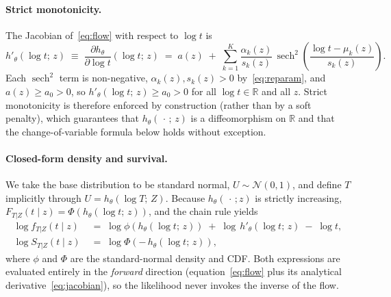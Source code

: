 \paragraph{Strict monotonicity.}
The Jacobian of~\eqref{eq:flow} with respect to $\log t$ is
\begin{equation}
    h'_\theta(\log t;\, z)
    \;\equiv\;
    \frac{\partial h_\theta}{\partial \log t}(\log t;\, z)
    \;=\;
    a(z) \;+\; \sum_{k=1}^{K} \frac{\alpha_k(z)}{s_k(z)}\,
        \operatorname{sech}^{2}\!\left(\frac{\log t - \mu_k(z)}{s_k(z)}\right).
    \label{eq:jacobian}
\end{equation}
Each $\operatorname{sech}^{2}$ term is non-negative, $\alpha_k(z), s_k(z) > 0$
by~\eqref{eq:reparam}, and $a(z) \ge a_0 > 0$, so
$h'_\theta(\log t;\, z) \ge a_0 > 0$ for all $\log t \in \mathbb{R}$ and all
$z$. Strict monotonicity is therefore enforced by construction (rather than
by a soft penalty), which guarantees that $h_\theta(\,\cdot\,;\, z)$ is a
diffeomorphism on $\mathbb{R}$ and that the change-of-variable formula below
holds without exception.

\paragraph{Closed-form density and survival.}
We take the base distribution to be standard normal, $U \sim \mathcal{N}(0, 1)$,
and define $T$ implicitly through $U = h_\theta(\log T;\, Z)$. Because
$h_\theta(\,\cdot\,; z)$ is strictly increasing,
$F_{T|Z}(t \mid z) = \Phi(h_\theta(\log t;\, z))$, and the chain rule
yields
\begin{align}
    \log f_{T|Z}(t \mid z)
    &\;=\;
    \log \phi\!\left(h_\theta(\log t;\, z)\right)
    \;+\;
    \log\, h'_\theta(\log t;\, z)
    \;-\;
    \log t,
    \label{eq:logpdf}\\[2pt]
    \log S_{T|Z}(t \mid z)
    &\;=\;
    \log \Phi\!\left(-\,h_\theta(\log t;\, z)\right),
    \label{eq:logsurv}
\end{align}
where $\phi$ and $\Phi$ are the standard-normal density and CDF. Both
expressions are evaluated entirely in the \emph{forward} direction
(equation~\eqref{eq:flow} plus its analytical derivative~\eqref{eq:jacobian}),
so the likelihood never invokes the inverse of the flow.

